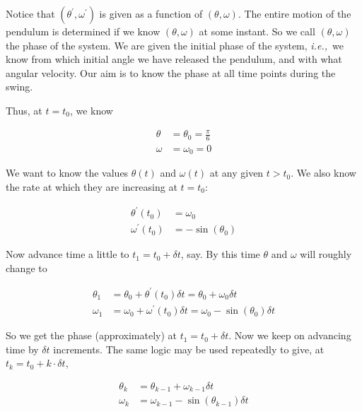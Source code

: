 \documentclass[a4paper,11pt]{report}
\begin{document}
\begin{enumerate}
    Notice that $(\theta^\prime, \omega^\prime)$ is given as a function of $(\theta,
    \omega)$. The entire motion of the pendulum is determined if we know $(\theta,
    \omega)$ at some instant. So we call $(\theta, \omega)$ the phase of the system. We
    are given the initial phase of the system, \textit{i.e.,}\ we know from which initial
    angle we have released the pendulum, and with what angular velocity. Our aim is to 
    know the phase at all time points during the swing.

    Thus, at $t = t_0$, we know
    
    \begin{equation*}
    \begin{aligned}
    \theta &= \theta_0 = \frac{\pi}{6} \\
    \omega &= \omega_0 = 0
    \end{aligned}
    \end{equation*}

    We want to know the values $\theta(t)$ and $\omega(t)$ at any given $t > t_0$. We 
    also know the rate at which they are increasing at $t = t_0$:

    \begin{equation*}
    \begin{aligned}
    \theta^{\prime}(t_0) &= \omega_0 \\
    \omega^{\prime}(t_0) &= - \sin(\theta_0)
    \end{aligned}
    \end{equation*}

    Now advance time a little to $t_1 = t_0 + \delta t$, say. By this time $\theta$ and
    $\omega$ will roughly change to

    \begin{equation*}
    \begin{aligned}
    \theta_1 &= \theta_0 + \theta^{\prime}(t_0) \delta t = \theta_0 + \omega_0 \delta t \\
    \omega_1 &= \omega_0 + \omega^{\prime}(t_0) \delta t = \omega_0 - \sin(\theta_0) \delta t
    \end{aligned}
    \end{equation*}

    So we get the phase (approximately) at $t_1 = t_0 + \delta t$. Now we keep on
    advancing time by $\delta t$ increments. The same logic may be used repeatedly to 
    give, at $t_k = t_0 + k \cdot \delta t$,

    \begin{equation*}
    \begin{aligned}
    \theta_k &= \theta_{k-1} + \omega_{k-1} \delta t \\
    \omega_k &= \omega_{k-1} - \sin(\theta_{k-1}) \delta t
    \end{aligned}
    \end{equation*}


\end{enumerate}
\end{document}
